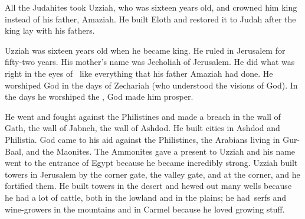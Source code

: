 
\begin{inparaenum}
   All the Judahites took Uzziah, who was sixteen years old, and crowned him king instead of his father, Amaziah.%
   He built Eloth and restored it to Judah after the king lay with his fathers.%

   Uzziah was sixteen years old when he became king. He ruled in Jerusalem for fifty-two years. His mother's name was Jecholiah of Jerusalem.%
   He did what was right in the eyes of \god\ like everything that his father Amaziah had done.%
   He worshiped God in the days of Zechariah (who understood the visions of God). In the days he worshiped the \lord, God made him prosper.%

   He went and fought against the Philistines and made a breach in the wall of Gath, the wall of Jabneh, the wall of Ashdod. He built cities in Ashdod and Philistia.%
   God came to his aid against the Philistines, the Arabians living in Gur-Baal, and the Maonites.%
   The Ammonites gave a present to Uzziah and his name went to the entrance of Egypt because he became incredibly strong.%
   Uzziah built towers in Jerusalem by the corner gate, the valley gate, and at the corner, and he fortified them.%
   He built towers in the desert and hewed out many wells because he had a lot of cattle, both in the lowland and in the plains; he had\understood{}\ serfs and wine-growers in the mountains and in Carmel because he loved growing stuff.%


\end{inparaenum}
